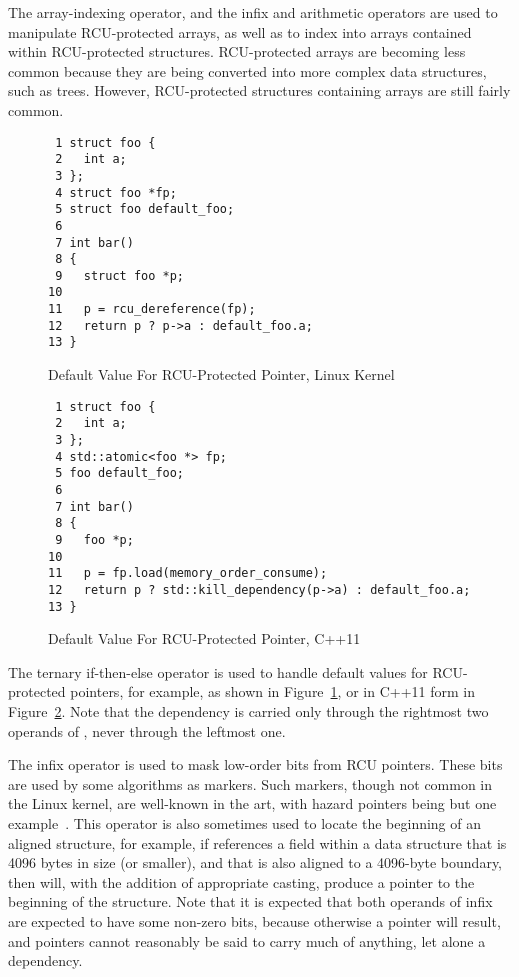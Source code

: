 \documentclass[letterpaper,twocolumn,10pt]{article}
\begin{document}
The \co{[]} array-indexing operator, and the infix \co{+} and \co{-}
arithmetic operators are used to manipulate RCU-protected arrays,
as well as to index into arrays contained within RCU-protected structures.
RCU-protected arrays are becoming less common because they are being
converted into more complex data structures, such as trees.
However, RCU-protected structures containing arrays are still fairly common.

\begin{figure}[tbp]
{ \scriptsize
\begin{verbatim}
 1 struct foo {
 2   int a;
 3 };
 4 struct foo *fp;
 5 struct foo default_foo;
 6 
 7 int bar()
 8 {
 9   struct foo *p;
10 
11   p = rcu_dereference(fp);
12   return p ? p->a : default_foo.a;
13 }
\end{verbatim}
}
\caption{Default Value For RCU-Protected Pointer, Linux Kernel}
\label{fig:Default Value For RCU-Protected Pointer, Linux Kernel}
\end{figure}

\begin{figure}[tbp]
{ \scriptsize
\begin{verbatim}
 1 struct foo {
 2   int a;
 3 };
 4 std::atomic<foo *> fp;
 5 foo default_foo;
 6 
 7 int bar()
 8 {
 9   foo *p;
10 
11   p = fp.load(memory_order_consume);
12   return p ? std::kill_dependency(p->a) : default_foo.a;
13 }
\end{verbatim}
}
\caption{Default Value For RCU-Protected Pointer, C++11}
\label{fig:Default Value For RCU-Protected Pointer, C++11}
\end{figure}

The ternary  if-then-else operator is used to handle default
values for RCU-protected pointers, for example, as shown in
Figure~\ref{fig:Default Value For RCU-Protected Pointer, Linux Kernel},
or in C++11 form in
Figure~\ref{fig:Default Value For RCU-Protected Pointer, C++11}.
Note that the dependency is carried only through the rightmost two
operands of , never through the leftmost one.

The infix \co{&} operator is used to mask low-order bits from RCU pointers.
These bits are used by some algorithms as markers.
Such markers, though not common in the Linux kernel, are well-known in
the art, with hazard pointers being but one example~\cite{MagedMichael04a}.
This operator is also sometimes used to locate the beginning of an
aligned structure, for example, if  references a field within a
data structure that is 4096 bytes in size (or smaller), and that is also
aligned to a 4096-byte boundary, then  will, with the
addition of appropriate casting, produce a pointer to the beginning of
the structure.
Note that it is expected that both operands of infix \co{&} are expected
to have some non-zero bits, because otherwise a  pointer will
result, and  pointers cannot
reasonably be said to carry much of anything, let alone a dependency.
\end{document}
